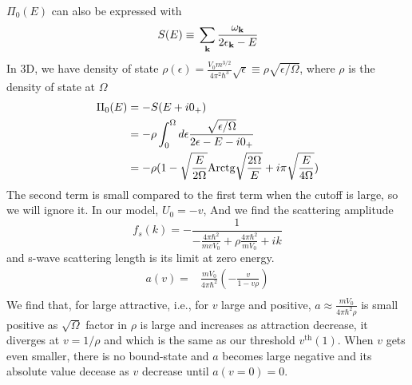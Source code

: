  $\Pi_{0}(E)$ can also be expressed with 
\begin{equation}
\,S(E)\equiv{}\sum_{\mathbf{k}}\frac{\omega_{\mathbf{k}}}{2\epsilon_{\mathbf{k}}-E}
\end{equation}
In 3D, we have density of state $\rho(\epsilon)=\frac{V_{0}m^{3/2}}{4\pi^{2}\hbar^{3}}\sqrt{\epsilon}\equiv\rho\sqrt{\epsilon/\Omega}$, where $\rho$ is the density of state at $\Omega$
\begin{equation}
\begin{split}
\Pi_{0}(E)&=-S(E+i0_{+})\\
&=-\rho\int_0^{\Omega}{}d\epsilon\frac{\sqrt{\epsilon/\Omega}}{2\epsilon-E-i0_{+}}\\
&=-\rho(1-\sqrt{\frac{E}{2\Omega}}\text{Arctg}\sqrt{\frac{2\Omega}{E}}+i\pi\sqrt{\frac{E}{4\Omega}})
\end{split}
\end{equation} 	
The second term is small compared to the first term when the cutoff is large, so we will ignore it. 
In our model, $U_0=-v$, And we find the scattering amplitude 
\begin{equation}
f_{s}(k)=-\frac{1}{-\frac{4\pi\hbar^{2}}{mvV_{0}}+\rho\frac{4\pi\hbar^{2}}{mV_{0}}+ik}
\end{equation}
and s-wave scattering length is its limit at zero energy. 
\begin{equation}
\begin{split}
a(v)=&\frac{mV_{0}}{4\pi\hbar^{2}}\left(-\frac{v}{1-v\rho}\right)\\
          \end{split}
\end{equation}
We find that, for large attractive, i.e., for $v$ large and positive, $a\approx\frac{mV_{0}}{4\pi\hbar^{2}\rho}$ is small positive as $\sqrt\Omega$ factor in $\rho$ is large and increases as attraction decrease, it diverges at $v=1/\rho$ and which is the same as our threshold $v^{\text{th}}(1)$.  When $v$ gets even smaller, there is no bound-state and $a$ becomes large negative and its absolute value decease as $v$ decrease until $a(v=0)=0$. 
